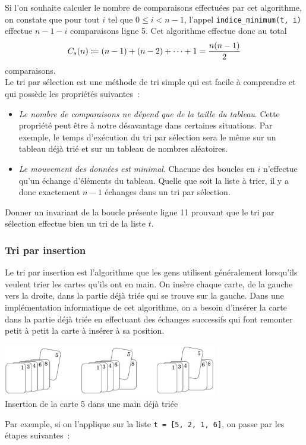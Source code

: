 \documentclass{magnoliaold}
\begin{document}
Si l'on souhaite calculer le nombre de comparaisons effectuées par cet algorithme, on constate que
pour tout $i$ tel que $0\leq i < n-1$, l'appel \verb!indice_minimum(t, i)! effectue $n-1-i$ comparaisons ligne 5. Cet algorithme effectue donc au total
\[C_s(n)\coloneqq (n-1)+(n-2)+\cdots+1 = \frac{n(n-1)}{2}\]
comparaisons.\\

Le tri par sélection est une méthode de tri simple qui est facile à comprendre et
qui possède les propriétés suivantes~:
\begin{itemize}
\item \emph{Le nombre de comparaisons ne dépend que de la taille du tableau}. Cette
  propriété peut être à notre désavantage dans certaines situations. Par exemple,
  le temps d'exécution du tri par sélection sera le même sur un tableau déjà trié et
  sur un tableau de nombres aléatoires.
\item \emph{Le mouvement des données est minimal}. Chacune des boucles en $i$
  n'effectue qu'un échange d'éléments du tableau. Quelle que soit la liste à trier, il y a donc
  exactement $n-1$ échanges dans un tri par sélection.
\end{itemize}

\begin{exoUnique}
\exo Donner un invariant de la boucle présente ligne 11 prouvant que le tri par sélection
  effectue bien un tri de la liste $t$.
\end{exoUnique}

\subsubsection{Tri par insertion}

Le tri par insertion est l'algorithme que les gens utilisent généralement lorsqu'ils
veulent trier les cartes qu'ils ont en main. On insère chaque carte, de la gauche
vers la droite, dans la partie déjà triée qui se trouve sur la gauche.
Dans une implémentation informatique de cet algorithme, on a besoin d'insérer la carte
dans la partie déjà triée en effectuant des échanges successifs qui font remonter
petit à petit la carte à insérer à sa position.

\begin{center}
\includegraphics[width=0.7\textwidth]{../../commun/images/python-cours-insertion_carte}\\
Insertion de la carte 5 dans une main déjà triée
\end{center}
\noindent Par exemple,
si on l'applique sur la liste \verb!t = [5, 2, 1, 6]!, on passe par les étapes
suivantes~: 
\end{document}
